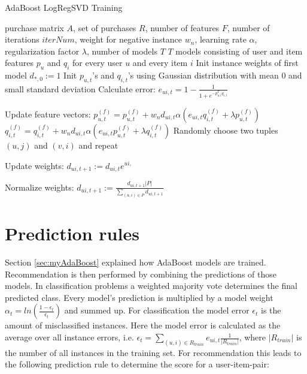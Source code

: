 \documentclass[10pt]{reportMaster}
\begin{document}
\begin{algorithm}
	\caption{AdaBoost LogRegSVD Training}
	\label{alg:AdaBoostLogRegSVDTraining}
	\begin{algorithmic}[1]
		\Require purchase matrix $A$, set of purchases $R$, number of features $F$, number of iterations $iterNum$, weight for negative instance $w_n$, learning rate $\alpha$, regularization factor $\lambda$, number of models $T$
		\Ensure $T$ models consisting of user and item features $p_u$ and $q_i$ for every user $u$ and every item $i$
		\State Init instance weights of first model $d_{*,0} := 1$
				\State Init $p_{u,t}$'s and $q_{i,t}$'s using Gaussian distribution with mean $0$ and small standard deviation
					\State Calculate error:
					\State $e_{ui,t} = 1 - \frac{1}{1 + e^{-p_{u,t}^Tq_{i,t}}}$
					
					\State Update feature vectors:
						\State $p_{u,t}^{(f)} = p_{u,t}^{(f)} + w_n d_{ui,t} \alpha (e_{ui, t} q_{i,t}^{(f)} + \lambda p_{u,t}^{(f)})$
						\State $q_{i,t}^{(f)} = q_{i,t}^{(f)} + w_n d_{ui,t} \alpha (e_{ui, t} p_{u,t}^{(f)} + \lambda q_{i,t}^{(f)})$
					\EndFor	
					\State Randomly choose two tuples $(u,j)$ and $(v,i)$ and repeat
				\EndFor
			\EndFor
			
			\State Update weights:
				\State $d_{ui,t+1} := d_{ui,t} e^{ui,}$
			\EndFor
			
			\State Normalize weights:
			\State $d_{ui,t+1} := \frac{d_{ui,t+1} |P|}{\sum_{(u,i) \in P}{d_{ui, t+1}}}$
			\EndFor 
		\EndFor
		
		
	\end{algorithmic}	
\end{algorithm}


\section{Prediction rules}
\label{sec:predictionRules}

Section \ref{sec:myAdaBoost} explained how AdaBoost models are trained.
Recommendation is then performed by combining the predictions of those models.
In classification problems a weighted majority vote determines the final predicted class.
Every model's prediction is multiplied by a model weight $\alpha_t = ln(\frac{1-\epsilon_t}{\epsilon_t})$ and summed up.
For classification the model error $\epsilon_t$ is the amount of misclassified instances.
Here the model error is calculated as the average over all instance errors, i.e. $\epsilon_t = \sum_{(u,i)\in R_{train}}{e_{ui,t}}\frac{1}{|R_{train}|}$, where $|R_{train}|$ is the number of all instances in the training set.
For recommendation this leads to the following prediction rule to determine the score for a user-item-pair:
\end{document}
